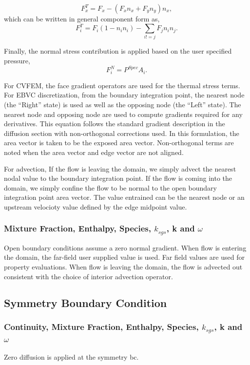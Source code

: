 \begin{equation}
  F^T_x = F_x - (F_x n_x + F_y n_y ) n_x,
\end{equation}
which can be written in general component form as,
\begin{equation}
  F^T_i = F_i(1-n_i n_i) - \sum_{i!=j} F_j n_i n_j.
\end{equation}

Finally, the normal stress contribution is applied based on the user specified pressure,
\begin{equation}
  F^N_i = P^{Spec} A_i.
\end{equation}

For CVFEM, the face gradient operators are used for the thermal stress terms. For EBVC discretization, 
from the boundary integration
point, the nearest node (the ``Right'' state) is used as well as the opposing node
(the ``Left'' state). The nearest node and opposing node are used to compute
gradients required for any derivatives. This equation follows the standard
gradient description in the diffusion section with non-orthogonal corrections used.
In this formulation, the area vector is taken to be the exposed area vector. 
Non-orthogonal terms are noted when the area vector and edge vector are not aligned.

For advection, If the flow is leaving the domain, we simply advect the nearest nodal value
to the boundary integration point. If the flow is coming into the domain,
we simply confine the flow to be normal to the open boundary integration 
point area vector. The value entrained can be the nearest node
or an upstream velocioty value defined by the edge midpoint value. 

\subsubsection{Mixture Fraction, Enthalpy, Species, $k_{sgs}$, k and $\omega$ }
Open boundary conditions assume a zero normal gradient. When flow is entering the domain, the far-field
user supplied value is used. Far field values are used for property evaluations. When flow is leaving the domain, 
the flow is advected out consistent with the
choice of interior advection operator.

\subsection{Symmetry Boundary Condition}

\subsubsection{Continuity, Mixture Fraction, Enthalpy, Species, $k_{sgs}$, k and $\omega$}
Zero diffusion is applied at the symmetry bc.

